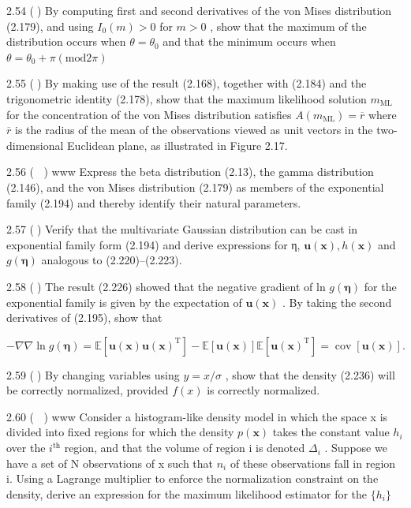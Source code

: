 \documentclass[
  10
]{article}
\begin{document}
2.54 () By computing first and second derivatives of the von Mises
distribution (2.179), and using \(I _ { 0 } ( m ) > 0\) for \(m > 0\) ,
show that the maximum of the distribution occurs when
\(\theta = \theta _ { 0 }\) and that the minimum occurs when
\(\theta = \theta _ { 0 } + \pi \left( { \mathrm { m o d } } 2 \pi \right)\)

2.55 () By making use of the result (2.168), together with (2.184) and
the trigonometric identity (2.178), show that the maximum likelihood
solution \(m _ { \mathrm { M L } }\) for the concentration of the von
Mises distribution satisfies
\(A ( m _ { \mathrm { M L } } ) = \overline { { r } }\) where
\(\overline { r }\) is the radius of the mean of the observations viewed
as unit vectors in the two-dimensional Euclidean plane, as illustrated
in Figure 2.17.

2.56 ( ) www Express the beta distribution (2.13), the gamma
distribution (2.146), and the von Mises distribution (2.179) as members
of the exponential family (2.194) and thereby identify their natural
parameters.

2.57 () Verify that the multivariate Gaussian distribution can be cast
in exponential family form (2.194) and derive expressions for η,
\(\mathbf { u } ( \mathbf { x } ) , h ( \mathbf { x } )\) and
\(g ( \pmb { \eta } )\) analogous to (2.220)--(2.223).

2.58 () The result (2.226) showed that the negative gradient of ln
\(g ( \pmb { \eta } )\) for the exponential family is given by the
expectation of \(\mathbf { u } ( \mathbf { x } )\) . By taking the
second derivatives of (2.195), show that

\[
- \nabla \nabla \ln g (\boldsymbol {\eta}) = \mathbb {E} [ \mathbf {u} (\mathbf {x}) \mathbf {u} (\mathbf {x}) ^ {\mathrm{T}} ] - \mathbb {E} [ \mathbf {u} (\mathbf {x}) ] \mathbb {E} [ \mathbf {u} (\mathbf {x}) ^ {\mathrm{T}} ] = \operatorname{cov} [ \mathbf {u} (\mathbf {x}) ].\tag{2.300}
\]

2.59 () By changing variables using \(y = x / \sigma\) , show that the
density (2.236) will be correctly normalized, provided \(f ( x )\) is
correctly normalized.

2.60 ( ) www Consider a histogram-like density model in which the space
x is divided into fixed regions for which the density
\(p ( \mathbf { x } )\) takes the constant value \(h _ { i }\) over the
\(i ^ { \mathrm { t h } }\) region, and that the volume of region i is
denoted \(\Delta _ { i }\) . Suppose we have a set of N observations of
x such that \(n _ { i }\) of these observations fall in region i. Using
a Lagrange multiplier to enforce the normalization constraint on the
density, derive an expression for the maximum likelihood estimator for
the \(\{ h _ { i } \}\)
\end{document}
